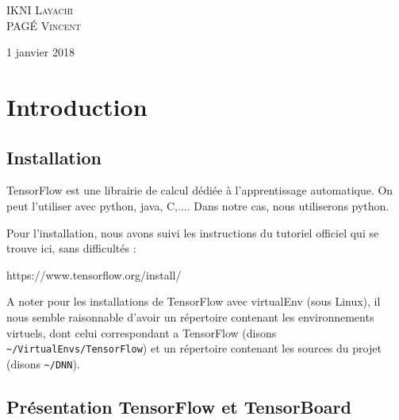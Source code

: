 \documentclass[a4paper,11pt]{book}
\begin{document}
\begin{titlepage}
\begin{sffamily}
\begin{center}
	
    \begin{minipage}{0.8\textwidth}
      \begin{flushleft} \large
        IKNI \textsc{Layachi}\\
        PAG\'E \textsc{Vincent}\\
      \end{flushleft}
    \end{minipage}
    \vfill    
    {\large 1\ier{} janvier 2018}
  \end{center}
  \end{sffamily}
\end{titlepage}
\ClearShipoutPicture



\newpage
\tableofcontents

\mainmatter
\chapter{Introduction }


\section{Installation}
TensorFlow est une librairie de calcul dédiée à l'apprentissage automatique. On peut l'utiliser avec python, java, C,.... Dans notre cas, nous utiliserons python.


Pour l'installation, nous avons suivi les instructions du tutoriel officiel qui se trouve ici, sans difficultés :

https://www.tensorflow.org/install/

A noter pour les installations de TensorFlow avec virtualEnv (sous Linux), il nous semble raisonnable d'avoir un répertoire contenant les environnements virtuels, dont celui correspondant a TensorFlow (disons \verb+~/VirtualEnvs/TensorFlow+) et un répertoire contenant les sources du projet (disons \verb+~/DNN+).


\section{Présentation TensorFlow et TensorBoard}
\end{document}
